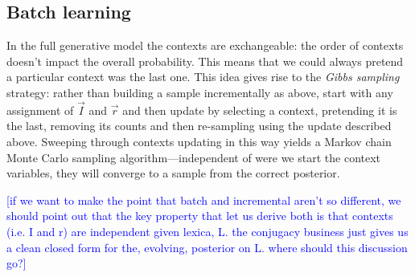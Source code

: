 \documentclass[man,noapacite,12pt]{apa2}
\newcommand{\nnote}[1]{\textcolor{blue}{[#1]}}
\begin{document}
\subsection{Batch learning}

In the full generative model the contexts are exchangeable: the order of contexts doesn't impact the overall probability. This means that we could always pretend a particular context was the last one. This idea gives rise to the \emph{Gibbs sampling} strategy: rather than building a sample incrementally as above, start with any assignment of $\vec{I}$ and $\vec{r}$ and then update by selecting a context, pretending it is the last, removing its counts and then re-sampling using the update described above. Sweeping through contexts updating in this way yields a Markov chain Monte Carlo sampling algorithm---independent of were we start the context variables, they will converge to a sample from the correct posterior.

\nnote{if we want to make the point that batch and incremental aren't so different, we should point out that the key property that let us derive both is that contexts (i.e. I and r) are independent given lexica, L. the conjugacy business just gives us a clean closed form for the, evolving, posterior on L. where should this discussion go?}


%
%
%
%
\end{document}
